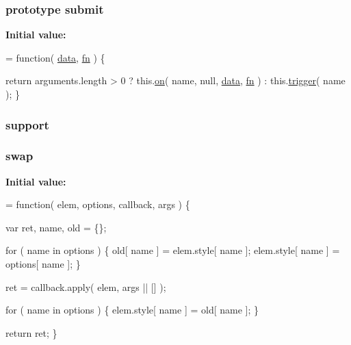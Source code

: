 \subsubsection[{submit}]{ {\bf prototype} submit}\label{jquery-1_810_82-vsdoc_8js_a58af54f4f7137a051db7e3e27bdfe1b5}
{\bfseries Initial value\+:}
\begin{DoxyCode}
= \textcolor{keyword}{function}( \hyperlink{jquery-1_810_82-vsdoc_8js_a609407b3456fdc3c5671a9fc4a226ff7}{data}, \hyperlink{jquery-1_810_82-vsdoc_8js_acef6bdaf6b9b20fdcca1ea86f0902c3b}{fn} ) \{


        \textcolor{keywordflow}{return} arguments.length > 0 ?
            this.\hyperlink{jquery-1_810_82-vsdoc_8js_ae453b412b883f60220d73468ef6c6dbc}{on}( name, null, \hyperlink{jquery-1_810_82-vsdoc_8js_a609407b3456fdc3c5671a9fc4a226ff7}{data}, \hyperlink{jquery-1_810_82-vsdoc_8js_acef6bdaf6b9b20fdcca1ea86f0902c3b}{fn} ) :
            this.\hyperlink{jquery-1_810_82-vsdoc_8js_a2388c4114d5e3e4eab020f973641519c}{trigger}( name );
    \}
\end{DoxyCode}
\hypertarget{jquery-1_810_82-vsdoc_8js_a1be69652377630fc5432ae5ec6463744}{}
\subsubsection[{support}]{ support}\label{jquery-1_810_82-vsdoc_8js_a1be69652377630fc5432ae5ec6463744}
\hypertarget{jquery-1_810_82-vsdoc_8js_a5e5b5f48f4ead1c526f9a8aede2780ef}{}
\subsubsection[{swap}]{ swap}\label{jquery-1_810_82-vsdoc_8js_a5e5b5f48f4ead1c526f9a8aede2780ef}
{\bfseries Initial value\+:}
\begin{DoxyCode}
= \textcolor{keyword}{function}( elem, options, callback, args ) \{

        var ret, name,
            old = \{\};

        
        \textcolor{keywordflow}{for} ( name in options ) \{
            old[ name ] = elem.style[ name ];
            elem.style[ name ] = options[ name ];
        \}

        ret = callback.apply( elem, args || [] );

        
        \textcolor{keywordflow}{for} ( name in options ) \{
            elem.style[ name ] = old[ name ];
        \}

        \textcolor{keywordflow}{return} ret;
    \}
\end{DoxyCode}
\hypertarget{jquery-1_810_82-vsdoc_8js_aa5b77da29631a344064bb3d20c8702de}{}
